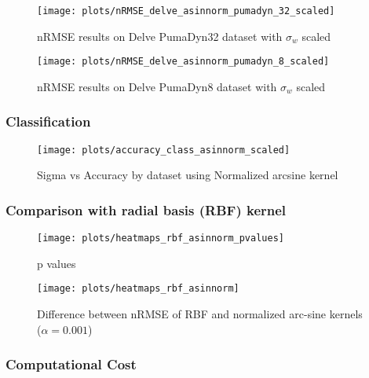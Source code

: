 \begin{figure}[H]
    \texttt{[image: plots/nRMSE\_delve\_asinnorm\_pumadyn\_32\_scaled]}
    \caption{nRMSE results on Delve PumaDyn32 dataset with $\sigma_w$ scaled}
    \label{fig:nrmse-delve-asinnorm-pumadyn-32-scaled}
\end{figure}

\begin{figure}[H]
    \texttt{[image: plots/nRMSE\_delve\_asinnorm\_pumadyn\_8\_scaled]}
    \caption{nRMSE results on Delve PumaDyn8 dataset with $\sigma_w$ scaled}
    \label{fig:nrmse-delve-asinnorm-pumadyn-8-scaled}
\end{figure}

\subsubsection{Classification}

\begin{figure}[H]
    \texttt{[image: plots/accuracy\_class\_asinnorm\_scaled]}
    \caption{Sigma vs Accuracy by dataset using Normalized arcsine kernel}%
    \label{fig:accuracy-asinnorm-scaled}
\end{figure}

\subsubsection{Comparison with radial basis (RBF) kernel}

\begin{figure}[H]
    \texttt{[image: plots/heatmaps\_rbf\_asinnorm\_pvalues]}
    \caption{p values}
    \label{fig:paired-ttest-rbf-asinnorm}
\end{figure}

\begin{figure}[H]
    \texttt{[image: plots/heatmaps\_rbf\_asinnorm]}
    \caption{Difference between nRMSE of RBF and normalized arc-sine kernels ($\alpha=0.001$)}
    \label{fig:paired-ttest-rbf-asinnorm-diff}
\end{figure}

\subsubsection{Computational Cost}
